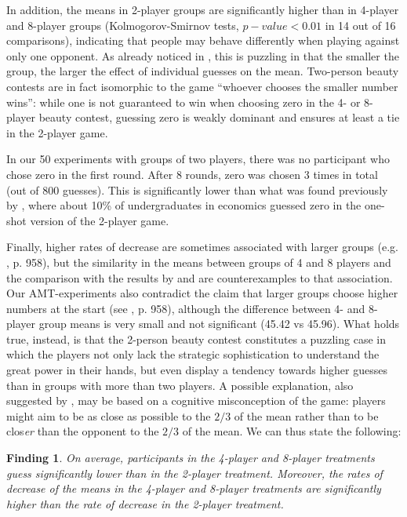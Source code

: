 \documentclass[12pt,review]{elsarticle}
\newtheorem{fdn}{Finding}
\begin{document}
In addition, the means in 2-player groups are significantly higher than in 4-player and 8-player groups (Kolmogorov-Smirnov tests, $p-value<0.01$ in 14 out of 16 comparisons), indicating that people may behave differently when playing against only one opponent. As already noticed in \citet{HoCamererWeigelt98}, this is puzzling in that the smaller the group, the larger the effect of individual guesses on the mean. Two-person beauty contests are in fact isomorphic to the game \textquotedblleft whoever chooses the smaller number wins\textquotedblright : while one is not
guaranteed to win when choosing zero in the 4- or 8-player beauty contest, guessing zero is weakly dominant and ensures at least a tie in the 2-player game. 

In our 50 experiments with groups of two players, there was no participant who chose zero in the first round. After
8 rounds, zero was chosen 3 times in total (out of 800 guesses). This is significantly lower than what was found previously by \citet{NagelGrosskopf2008}, where about 10\% of undergraduates in economics guessed zero in the one-shot version of the 2-player game.

Finally, higher rates of decrease are sometimes associated with larger groups (e.g. \citet{HoCamererWeigelt98}, p. 958), but the similarity in the means between groups of 4 and 8 players and the comparison with the results by \citet{ Kamm2008unter} and \citet{weber2003learning} are counterexamples to that association. Our AMT-experiments also contradict the claim that larger groups choose higher numbers at the start (see \citet{HoCamererWeigelt98}, p. 958), although the difference between 4- and 8-player group means is very small and not significant (45.42 vs 45.96). What holds true, instead, is that the 2-person beauty contest constitutes a puzzling case in which the players not only lack the strategic sophistication to understand the great power in their hands, but even display a tendency towards higher guesses than in groups with more than two players. A possible explanation, also suggested by \citet{NagelGrosskopf2008}, may be based on a cognitive misconception of the game: players might aim to be as close as possible to the $2/3$ of the mean rather than to be clos\emph{er} than the opponent to the $2/3$ of the mean. We can thus state the following:

\begin{fdn}
On average, participants in the 4-player and 8-player treatments guess significantly lower than in the 2-player treatment. Moreover, the rates of decrease of the means in the 4-player and 8-player treatments are significantly higher than the rate of decrease in the 2-player treatment.
\end{fdn}
\end{document}
